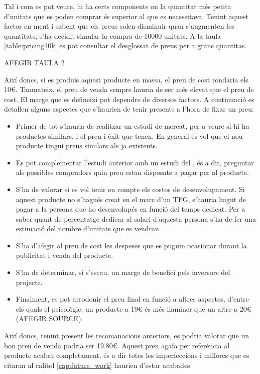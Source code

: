Tal i com es pot veure, hi ha certs components on la quantitat més petita
d'unitats que es poden comprar és superior al que es necessitava. Tenint aquest
factor en ment i sabent que els preus solen disminuir quan s'augmenten les
quantitats, s'ha decidit simular la compra de 10000 unitats. A la taula
\ref{table:pricing10k} es pot consultar el desglossat de preus per a
grans quantitas.

AFEGIR TAULA 2

Així doncs, si es produís aquest producte en massa, el preu de cost rondaria
els 10€. Tanmateix, el preu de venda sempre hauria de ser més elevat que
el preu de cost. El marge que es defineixi pot dependre de diversos factors.
A continuació es detallen alguns aspectes que s'haurien de tenir presents
a l'hora de fixar un preu:

\begin{itemize}
    \item Primer de tot s'hauria de realitzar un estudi de mercat, per a veure
    si hi ha productes similars, i el preu i èxit que tenen. En general es vol
    que el nou producte tingui preus similars als ja existents.
    \item Es pot complementar l'estudi anterior amb un estudi del ,
    és a dir, preguntar als possibles compradors quin preu estan disposats a
    pagar per al producte.
    \item S'ha de valorar si es vol tenir en compte els costos de
    desenvolupament. Si aquest producte no s'hagués creat en el marc d'un TFG,
    s'hauria hagut de pagar a la persona que ho desenvolupés en funció del
    temps dedicat. Per a saber quant de percentatge dedicar al salari d'aquesta
    persona s'ha de fer una estimació del nombre d'unitats que es vendran.
    \item S'ha d'afegir al preu de cost les despeses que es puguin ocasionar
    durant la publicitat i venda del producte.
    \item S'ha de determinar, si s'escau, un marge de benefici pels inversors
    del projecte.
    \item Finalment, es pot arrodonir el preu final en funció a altres aspectes,
    d'entre els quals el psicològic: un producte a 19€ és més llaminer que un
    altre a 20€ (AFEGIR SOURCE).
\end{itemize}

Així doncs, tenint present les recomanacions anteriors, es podria valorar que
un bon preu de venda podria ser 19.80€. Aquest preu agafa per referència al
producte acabat completament, és a dir totes les imperfeccions i millores que
es citaran al calítol \ref{cap:future_work} haurien d'estar acabades.

